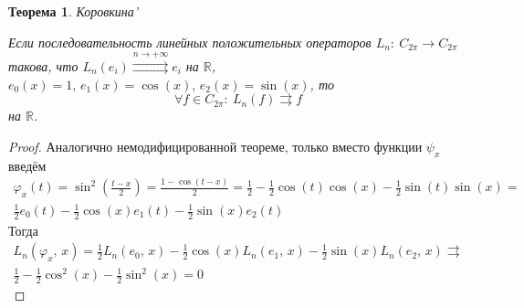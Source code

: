 \documentclass[a4paper,12pt]{article}
\renewcommand{\phi}{\ensuremath{\varphi}}
\theoremstyle{plain}
\newtheorem{theorem}{Теорема}[section]
\theoremstyle{definition}
\theoremstyle{remark}
\begin{document}
\begin{theorem}
	Коровкина'

	Если последовательность линейных положительных операторов $L_n:\: C_{2\pi} \to C_{2\pi}$ такова, что $L_n(e_i) \stackrel{n \to +\infty}{\rightrightarrows} e_i$ на $\mathbb{R}$, $e_0(x) = 1,\, e_1(x) = \cos(x),\, e_2(x) = \sin(x)$, то 
	\[\forall f \in C_{2\pi}:\: L_n(f) \rightrightarrows f\]
	на $\mathbb{R}$.
\end{theorem}

\begin{proof}
	Аналогично немодифицированной теореме, только вместо функции $\psi_x$ введём 
	\begin{align*}
		\phi_x(t) = \sin^2(\frac{t - x}{2}) = \frac{1 - \cos(t - x)}{2} = \frac{1}{2} - \frac{1}{2}\cos(t)\cos(x) - \frac{1}{2}\sin(t)\sin(x) = \\
		\frac{1}{2}e_0(t) - \frac{1}{2}\cos(x)e_1(t) - \frac{1}{2}\sin(x)e_2(t)
	\end{align*}
	Тогда 
	\begin{align*}
		L_n(\phi_x,\, x) = \frac{1}{2}L_n(e_0,\,x) - \frac{1}{2}\cos(x)L_n(e_1,\,x) - \frac{1}{2}\sin(x)L_n(e_2,\,x) \rightrightarrows \\
		\frac{1}{2} - \frac{1}{2}\cos^2(x) - \frac{1}{2}\sin^2(x) = 0 
	\end{align*}
\end{proof}
\end{document}
